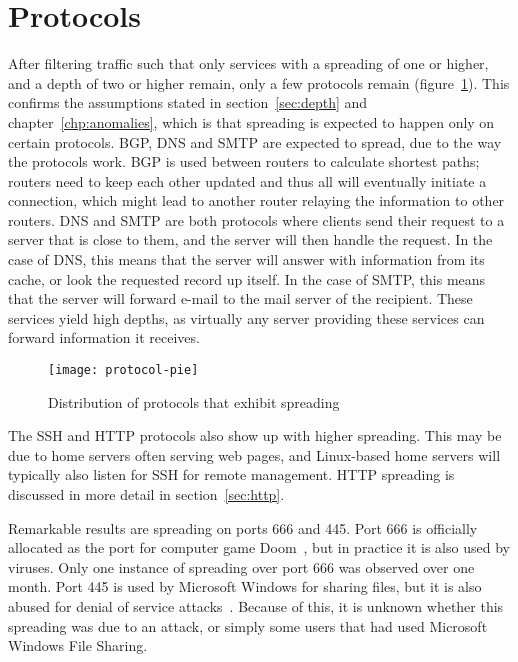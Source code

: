 \section{Protocols}
After filtering traffic such that only \gls{service}s with a spreading of one or higher,
 and a depth of two or higher remain, only a few protocols remain (figure~\ref{fig:protocol-pie}).
This confirms the assumptions stated in section~\ref{sec:depth} and chapter~\ref{chp:anomalies},
 which is that spreading is expected to happen only on certain protocols.
\Gls{BGP}, \gls{DNS} and \gls{SMTP} are expected to spread, due to the way the protocols work.
\Gls{BGP} is used between routers to calculate shortest paths; routers need to keep each other updated and thus all will eventually initiate a connection,
 which might lead to another router relaying the information to other routers.
\gls{DNS} and \gls{SMTP} are both protocols where clients send their request to a server that is close to them,
 and the server will then handle the request.
In the case of \gls{DNS}, this means that the server will answer with information from its cache, or look the requested record up itself.
In the case of \gls{SMTP}, this means that the server will forward e-mail to the mail server of the recipient.
These services yield high depths, as virtually any server providing these services can forward information it receives.


\begin{figure}[h!]
	\caption{Distribution of protocols that exhibit spreading}
	\label{fig:protocol-pie}
	\centering
		\texttt{[image: protocol-pie]}
\end{figure}


The \gls{SSH} and \gls{HTTP} protocols also show up with higher spreading.
This may be due to home servers often serving web pages,
 and Linux-based home servers will typically also listen for SSH for remote management.
HTTP spreading is discussed in more detail in section~\ref{sec:http}.

Remarkable results are spreading on ports 666 and 445.
Port 666 is officially allocated as the port for computer game Doom~\cite{rfc1700},
 but in practice it is also used by viruses.
Only one instance of spreading over port 666 was observed over one month.
Port 445 is used by Microsoft Windows for sharing files, but it is also abused for denial of service attacks~\cite{lazarevic2003comparative}.
Because of this, it is unknown whether this spreading was due to an attack, or simply some users that had used Microsoft Windows File Sharing.

